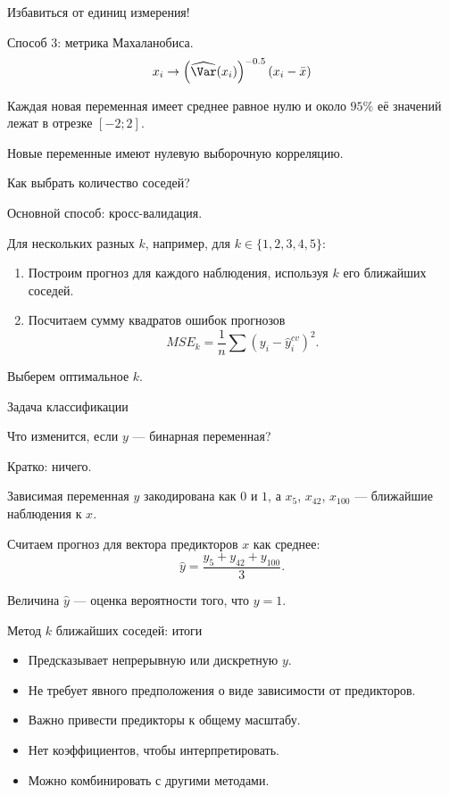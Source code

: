 \begin{frame}{Избавиться от единиц измерения!}

  Способ 3: метрика Махаланобиса.
   \[
   x_i \to \left(\widehat{ \Var }(x_i)\right)^{-0.5} (x_i - \bar x)
   \]

\pause

Каждая новая переменная имеет среднее равное нулю и 
около $95\%$ её значений лежат в отрезке $[-2; 2]$.

\pause 
Новые переменные имеют нулевую выборочную корреляцию. 

\end{frame}


\begin{frame}{Как выбрать количество соседей?}

Основной способ: \alert{кросс-валидация}. 

\pause 
Для нескольких разных $k$, например, для $k \in \{1, 2, 3, 4, 5 \}$:

\begin{enumerate}[<+->]

\item Построим прогноз для каждого наблюдения, используя $k$ его ближайших соседей. 
\item Посчитаем сумму квадратов ошибок прогнозов
\[
  MSE_{k} = \frac{1}{n}\sum (y_i - \hat y_i^{cv})^2.
\]
\end{enumerate}
\pause
Выберем \alert{оптимальное} $k$.
\end{frame}



\begin{frame}{Задача классификации}


Что изменится, если $y$ — \alert{бинарная} переменная?  
\pause

Кратко: \alert{ничего}.

\pause
Зависимая переменная $y$ закодирована как $0$ и $1$, 
а $x_5$, $x_{42}$, $x_{100}$ — ближайшие наблюдения к $x$.


Считаем прогноз для вектора предикторов $x$ как среднее:
\[
\hat y = \frac{y_5 + y_{42} + y_{100}}{3}.
\]

\pause

Величина $\hat y$ — \alert{оценка вероятности} того, что $y = 1$.

\end{frame}

\begin{frame}{Метод $k$ ближайших соседей: итоги}

  \begin{itemize}[<+->]
    \item Предсказывает непрерывную или дискретную $y$.
    \item Не требует явного предположения \alert{о виде зависимости} от предикторов.
    \item Важно привести \alert{предикторы к общему масштабу}.
    \item \alert{Нет коэффициентов}, чтобы интерпретировать. 
    \item Можно комбинировать с другими методами.
  \end{itemize}
\end{frame}

